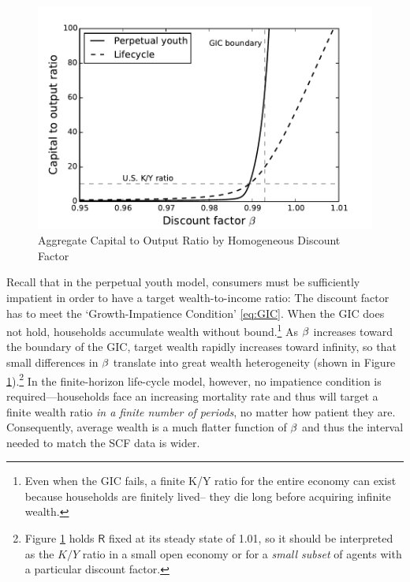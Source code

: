 \documentclass[12pt,titlepage]{econtex}
\begin{document}
\begin{figure}
  \caption{Aggregate Capital to Output Ratio by Homogeneous Discount Factor}
  \label{KYratioByBeta}
  \begin{center}
    \includegraphics[scale=1.25]{./Figures/KYratioByBeta}
  \end{center}
\end{figure}

Recall that in the perpetual youth model, consumers must be sufficiently impatient in order to have a target wealth-to-income ratio: The discount factor has to meet the `Growth-Impatience Condition' \eqref{eq:GIC}. When the GIC does not hold, households accumulate wealth without bound.\footnote{Even when the GIC fails, a finite K/Y ratio for the entire economy can exist because households are finitely lived-- they die long before acquiring infinite wealth.}  As $\beta$ increases toward the boundary of the GIC, target wealth rapidly increases toward infinity, so that small differences in $\beta$ translate into great wealth heterogeneity (shown in Figure \ref{KYratioByBeta}).\footnote{Figure \ref{KYratioByBeta} holds $\mathsf{R}$ fixed at its steady state of 1.01, so it should be interpreted as the $K/Y$ ratio in a small open economy or for a \textit{small subset} of agents with a particular discount factor.}  In the finite-horizon life-cycle model, however, no impatience condition is required---households face an increasing mortality rate and thus will target a finite wealth ratio \textit{in a finite number of periods}, no matter how patient they are. Consequently, average wealth is a much flatter function of $\beta$ and thus the interval needed to match the SCF data is wider.
\end{document}
